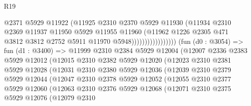 \begin{lexlean}{R19}
\begin{coremodule}
                                    @2371
                                    @5929
                                    @11922
                                    (@11925
                                      @2310
                                      @2370
                                      @5929
                                      @11930
                                      (@11934
                                        @2310
                                        @2369
                                        @11937
                                        @11950
                                        @5929
                                        @11955
                                        @11960
                                        (@11962
                                          @1226
                                          @2305
                                          @471
                                          @3812
                                          @3812
                                          @2752
                                          @5911
                                          @11970
                                          @5948)))))))))))))))))
        (fun (d0 : @3054) =>
        fun (d1 : @3400) =>
        @11999
          @2310
          @2384
          @5929
          @12004
          (@12007
            @2336
            @2383
            @5929
            @12012
            (@12015
              @2310
              @2382
              @5929
              @12020
              (@12023
                @2310
                @2381
                @5929
                @12028
                (@12031
                  @2310
                  @2380
                  @5929
                  @12036
                  (@12039
                    @2310
                    @2379
                    @5929
                    @12044
                    (@12047
                      @2310
                      @2378
                      @5929
                      @12052
                      (@12055
                        @2310
                        @2377
                        @5929
                        @12060
                        (@12063
                          @2310
                          @2376
                          @5929
                          @12068
                          (@12071
                            @2310
                            @2375
                            @5929
                            @12076
                            (@12079
                              @2310

\end{coremodule}
\end{lexlean}
